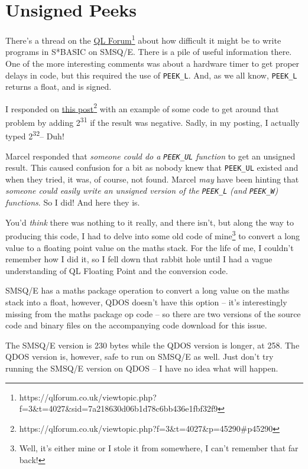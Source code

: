 
\chapter{Unsigned Peeks}

There's a thread on the \href{https://qlforum.co.uk/viewtopic.php?f=3&t=4027&sid=7a218630d06b1d78c6bb436e1fbf32f9}{QL Forum}\footnote{https://qlforum.co.uk/viewtopic.php?f=3\&t=4027\&sid=7a218630d06b1d78c6bb436e1fbf32f9}
about how difficult it might be to write programs in S{*}BASIC on
SMSQ/E. There is a pile of useful information there. One of the more
interesting comments was about a hardware timer to get proper delays
in code, but this required the use of \texttt{PEEK\_L}. And, as we
all know, \texttt{PEEK\_L} returns a float, and is signed. 

I responded on \href{https://qlforum.co.uk/viewtopic.php?f=3&t=4027&p=45290\#p45290}{this post}\footnote{https://qlforum.co.uk/viewtopic.php?f=3\&t=4027\&p=45290\#p45290}
with an example of some code to get around that problem by adding
2\textsuperscript{31} if the result was negative. Sadly, in my posting,
I actually typed 2\textsuperscript{32}-- Duh! 

Marcel responded that \emph{someone could do a }\texttt{\emph{PEEK\_UL}}\emph{
function} to get an unsigned result. This caused confusion for a bit
as nobody knew that \texttt{PEEK\_UL} existed and when they tried,
it was, of course, not found. Marcel \emph{may} have been hinting
that \emph{someone could easily write an unsigned version of the }\texttt{\emph{PEEK\_L}}\emph{
(and }\texttt{\emph{PEEK\_W}}\emph{) functions}. So I did! And here
they is.

You'd \emph{think} there was nothing to it really, and there isn't,
but along the way to producing this code, I had to delve into some
old code of mine\footnote{Well, it's either mine or I stole it from somewhere, I can't remember
that far back!} to convert a long value to a floating point value on the maths stack.
For the life of me, I couldn't remember how I did it, so I fell down
that rabbit hole until I had a vague understanding of QL Floating
Point and the conversion code.

SMSQ/E has a maths package operation to convert a long value on the
maths stack into a float, however, QDOS doesn't have this option --
it's interestingly missing from the maths package op code -- so there
are two versions of the source code and binary files on the accompanying
code download for this issue.

The SMSQ/E version is 230 bytes while the QDOS version is longer,
at 258. The QDOS version is, however, safe to run on SMSQ/E as well.
Just don't try running the SMSQ/E version on QDOS -- I have no idea
what will happen.

